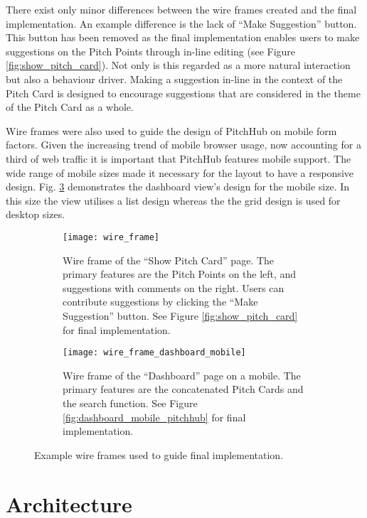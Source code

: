 There exist only minor differences between the wire frames created and the final implementation. An example difference is the lack of ``Make Suggestion'' button. This button has been removed as the final implementation enables users to make suggestions on the Pitch Points through in-line editing (see Figure \ref{fig:show_pitch_card}). Not only is this regarded as a more natural interaction but also a behaviour driver. Making a suggestion in-line in the context of the Pitch Card is designed to encourage suggestions that are considered in the theme of the Pitch Card as a whole.

Wire frames were also used to guide the design of PitchHub on mobile form factors. Given the increasing trend of mobile browser usage, now accounting for a third of web traffic \cite{Mobile_rise:online} it is important that PitchHub features mobile support. The wide range of mobile sizes made it necessary for the layout to have a responsive design. Fig. \ref{fig:wire_frame_mobile} demonstrates the dashboard view's design for the mobile size. In this size the view utilises a list design whereas the the grid design is used for desktop sizes.

\begin{figure}[ht]
  \begin{subfigure}[t]{.45\textwidth}
  \centering
    \texttt{[image: wire\_frame]}
    \caption{Wire frame of the ``Show Pitch Card'' page. The primary features are the Pitch Points on the left, and suggestions with comments on the right. Users can contribute suggestions by clicking the ``Make Suggestion'' button. See Figure \ref{fig:show_pitch_card} for final implementation.}
    \label{fig:wire_frame}
  \end{subfigure}\hfill
  \begin{subfigure}[t]{.45\textwidth}
  \centering
    \texttt{[image: wire\_frame\_dashboard\_mobile]}
    \caption{Wire frame of the ``Dashboard'' page on a mobile. The primary features are the concatenated Pitch Cards and the search function. See Figure \ref{fig:dashboard_mobile_pitchhub} for final implementation.}
    \label{fig:wire_frame_mobile}
  \end{subfigure}
  \caption{Example wire frames used to guide final implementation.}
\end{figure}

\section{Architecture}

